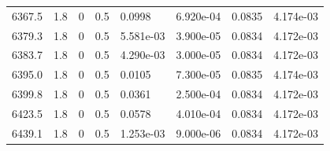 \documentclass[preview]{standalone}
\begin{document}
{{{{{{\begin{tabular}{L{1.2cm}C{1.2cm} C{0.3cm}C{0.5cm} C{1.4cm}C{1.4cm} C{1.4cm}C{1.4cm}}
  6367.5  &   1.8  & 0     & 0.5 &  0.0998  & 6.920e-04  & 0.0835 &  4.174e-03   \\ 
  6379.3  &   1.8  & 0     & 0.5 &  5.581e-03  & 3.900e-05  & 0.0834 &  4.172e-03   \\ 
  6383.7  &   1.8  & 0     & 0.5 &  4.290e-03  & 3.000e-05  & 0.0834 &  4.172e-03   \\ 
  6395.0  &   1.8  & 0     & 0.5 &  0.0105  & 7.300e-05  & 0.0835 &  4.174e-03   \\ 
  6399.8  &   1.8  & 0     & 0.5 &  0.0361  & 2.500e-04  & 0.0834 &  4.172e-03   \\ 
  6423.5  &   1.8  & 0     & 0.5 &  0.0578  & 4.010e-04  & 0.0834 &  4.172e-03   \\ 
  6439.1  &   1.8  & 0     & 0.5 &  1.253e-03  & 9.000e-06  & 0.0834 &  4.172e-03   \\ 
\hline 
\end{tabular} 

}}}}}}
\end{document}
